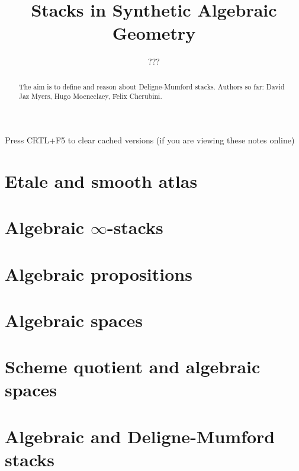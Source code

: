 \documentclass{../util/zariski}
\title{Stacks in Synthetic Algebraic Geometry}
\author{???}
\begin{document}
\maketitle

\begin{center}
  \color{purple}
  \large{Press CRTL+F5 to clear cached versions}
  \large{(if you are viewing these notes online)}
\end{center}

\begin{abstract}
  The aim is to define and reason about Deligne-Mumford stacks.
  Authors so far: David Jaz Myers, Hugo Moeneclaey, Felix Cherubini.
\end{abstract}

\tableofcontents

\section{Etale and smooth atlas}


\section{Algebraic $\infty$-stacks}


\section{Algebraic propositions}


\section{Algebraic spaces}


\section{Scheme quotient and algebraic spaces}


\section{Algebraic and Deligne-Mumford stacks}



\printindex

\printbibliography
\end{document}
